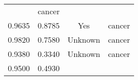 \documentclass[12pt,]{article}
\begin{document}
\begin{longtable}[]{@{}cccc@{}}
\begin{minipage}[t]{0.22\columnwidth}
\end{minipage} & \begin{minipage}[t]{0.16\columnwidth}\centering\strut
cancer\strut
\end{minipage}\tabularnewline
\begin{minipage}[t]{0.24\columnwidth}\centering\strut
0.9635\strut
\end{minipage} & \begin{minipage}[t]{0.26\columnwidth}\centering\strut
0.8785\strut
\end{minipage} & \begin{minipage}[t]{0.22\columnwidth}\centering\strut
Yes\strut
\end{minipage} & \begin{minipage}[t]{0.16\columnwidth}\centering\strut
cancer\strut
\end{minipage}\tabularnewline
\begin{minipage}[t]{0.24\columnwidth}\centering\strut
0.9820\strut
\end{minipage} & \begin{minipage}[t]{0.26\columnwidth}\centering\strut
0.7580\strut
\end{minipage} & \begin{minipage}[t]{0.22\columnwidth}\centering\strut
Unknown\strut
\end{minipage} & \begin{minipage}[t]{0.16\columnwidth}\centering\strut
cancer\strut
\end{minipage}\tabularnewline
\begin{minipage}[t]{0.24\columnwidth}\centering\strut
0.9380\strut
\end{minipage} & \begin{minipage}[t]{0.26\columnwidth}\centering\strut
0.3340\strut
\end{minipage} & \begin{minipage}[t]{0.22\columnwidth}\centering\strut
Unknown\strut
\end{minipage} & \begin{minipage}[t]{0.16\columnwidth}\centering\strut
cancer\strut
\end{minipage}\tabularnewline
\begin{minipage}[t]{0.24\columnwidth}\centering\strut
0.9500\strut
\end{minipage} & \begin{minipage}[t]{0.26\columnwidth}\centering\strut
0.4930\strut
\end{minipage} & \begin{minipage}[t]{0.22\columnwidth}\centering\strut

\end{minipage}
\end{longtable}
\end{document}
